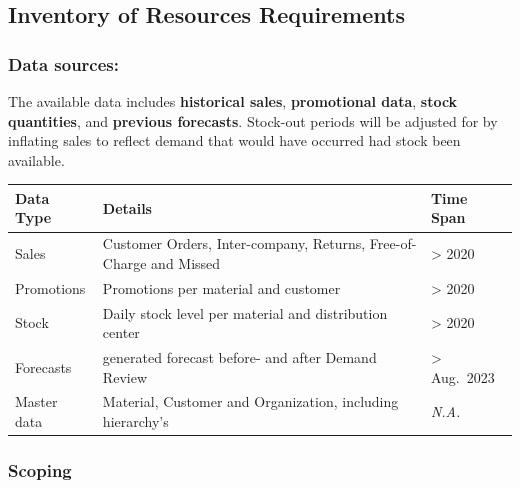 \documentclass[
  american,
  10,
  a4paper,
]{book}
\theoremstyle{definition}
\theoremstyle{remark}
\begin{document}
\subsection{Inventory of Resources
Requirements}\label{inventory-of-resources-requirements}

\subsubsection{Data sources:}\label{data-sources}

The available data includes \textbf{historical sales},
\textbf{promotional data}, \textbf{stock quantities}, and
\textbf{previous forecasts}. Stock-out periods will be adjusted for by
inflating sales to reflect demand that would have occurred had stock
been available.

\begin{longtable}[]{@{}
  >{\raggedright\arraybackslash}p{}
  >{\raggedright\arraybackslash}p{}
  >{\raggedright\arraybackslash}p{}@{}}
\toprule\noalign{}
\begin{minipage}[b]{\linewidth}\raggedright
Data Type
\end{minipage} & \begin{minipage}[b]{\linewidth}\raggedright
Details
\end{minipage} & \begin{minipage}[b]{\linewidth}\raggedright
Time Span
\end{minipage} \\
\midrule\noalign{}
\endhead
\bottomrule\noalign{}
\endlastfoot
Sales & Customer Orders, Inter-company, Returns, Free-of-Charge and
Missed & \textgreater{} 2020 \\
Promotions & Promotions per material and customer & \textgreater{}
2020 \\
Stock & Daily stock level per material and distribution center &
\textgreater{} 2020 \\
Forecasts & generated forecast before- and after Demand Review &
\textgreater{} Aug.~2023 \\
Master data & Material, Customer and Organization, including hierarchy's
& \emph{N.A.} \\
\end{longtable}

\subsubsection{Scoping}\label{scoping}
\end{document}
